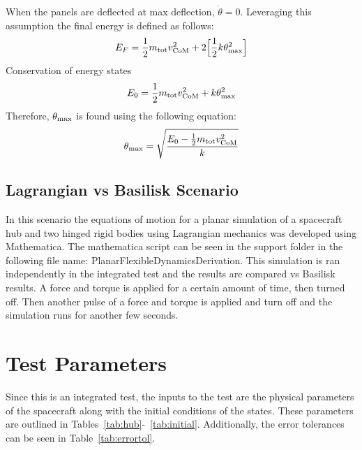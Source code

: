 When the panels are deflected at max deflection, $\dot{\theta} = 0$. Leveraging this assumption the final energy is defined as follows:
\begin{equation}
E_F = \frac{1}{2} m_{\textnormal{tot}} v_{\textnormal{CoM}}^2 + 2\Big[\frac{1}{2} k \theta_{\textnormal{max}}^2\Big]
\end{equation}
Conservation of energy states
\begin{equation}
E_0 = \frac{1}{2} m_{\textnormal{tot}} v_{\textnormal{CoM}}^2 + k \theta_{\textnormal{max}}^2
\end{equation}
Therefore, $\theta_{\textnormal{max}}$ is found using the following equation:
\begin{equation}
\theta_{\textnormal{max}} = \sqrt{\frac{E_0 - \frac{1}{2} m_{\textnormal{tot}} v_{\textnormal{CoM}}^2}{k}}
\end{equation}

\subsection{Lagrangian vs Basilisk Scenario}

In this scenario the equations of motion for a planar simulation of a spacecraft hub and two hinged rigid bodies using Lagrangian mechanics was developed using Mathematica. The mathematica script can be seen in the support folder in the following file name: PlanarFlexibleDynamicsDerivation. This simulation is ran independently in the integrated test and the results are compared vs Basilisk results. A force and torque is applied for a certain amount of time, then turned off. Then another pulse of a force and torque is applied and turn off and the simulation runs for another few seconds.

\section{Test Parameters}

Since this is an integrated test, the inputs to the test are the physical parameters of the spacecraft along with the initial conditions of the states. These parameters are outlined in Tables~\ref{tab:hub}-~\ref{tab:initial}. Additionally, the error tolerances can be seen in Table~\ref{tab:errortol}.

